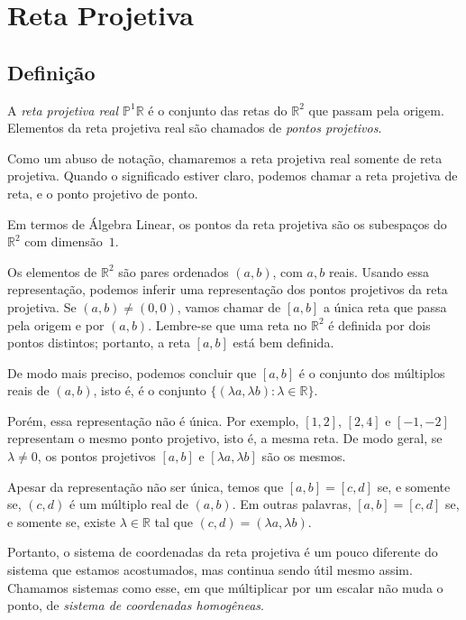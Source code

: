 \chapter{Reta Projetiva}

\section{Definição}

\begin{defn}
A \emph{reta projetiva real \(\mathbb{P}^1\mathbb{R}\)} é o conjunto das retas do \(\mathbb{R}^2\) que passam pela origem.
Elementos da reta projetiva real são chamados de \emph{pontos projetivos}.
\end{defn}

Como um abuso de notação, chamaremos a reta projetiva real somente de reta projetiva.
Quando o significado estiver claro, podemos chamar a reta projetiva de reta, e o ponto projetivo de ponto.

Em termos de Álgebra Linear, os pontos da reta projetiva são os subespaços do $\mathbb{R}^2$ com dimensão~$1$.

Os elementos de \(\mathbb{R}^2\) são pares ordenados \((a, b)\), com \(a, b\) reais.
Usando essa representação, podemos inferir uma representação dos pontos projetivos da reta projetiva.
Se \((a, b) \neq (0, 0)\), vamos chamar de \([a, b]\) a única reta que passa pela origem e por \((a, b)\).
Lembre-se que uma reta no \(\mathbb{R}^2\) é definida por dois pontos distintos; portanto, a reta \([a, b]\) está bem definida.

De modo mais preciso, podemos concluir que \([a, b]\) é o conjunto dos múltiplos reais de \((a, b)\), isto é, é o conjunto \(\{ (\lambda a, \lambda b) : \lambda \in \mathbb{R}\}\).

Porém, essa representação não é única.
Por exemplo, \([1, 2]\), \([2, 4]\) e \([-1, -2]\) representam o mesmo ponto projetivo, isto é, a mesma reta.
De modo geral, se \(\lambda \neq 0\), os pontos projetivos \([a, b]\) e \([\lambda a, \lambda b]\) são os mesmos.

Apesar da representação não ser única, temos que \([a, b] = [c, d]\) se, e somente se, \((c, d)\) é um múltiplo real de \((a, b)\).
Em outras palavras, \([a, b] = [c, d]\) se, e somente se, existe \(\lambda \in \mathbb{R}\) tal que \((c, d) = (\lambda a, \lambda b)\).

Portanto, o sistema de coordenadas da reta projetiva é um pouco diferente do sistema que estamos acostumados, mas continua sendo útil mesmo assim. Chamamos sistemas como esse, em que múltiplicar por um escalar não muda o ponto, de \emph{sistema de coordenadas homogêneas}.

